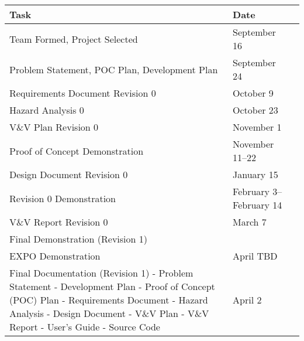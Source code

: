 \documentclass{article}
\begin{document}
\noindent \begin{tabular}{ p{5.7cm} l r}
    
    \textbf{Task} & \textbf{Date} \\
    \toprule
    Team Formed, Project Selected & September 16 \\
 
    Problem Statement, POC Plan, Development Plan & September 24 \\
 
    Requirements Document Revision 0 & October 9 \\
 
    Hazard Analysis 0 & October 23 \\
 
    V\&V Plan Revision 0 & November 1 \\
 
    Proof of Concept Demonstration & November 11--22 \\
 
    Design Document Revision 0 & January 15 \\
 
    Revision 0 Demonstration & February 3--February 14\\
 
    V\&V Report Revision 0 & March 7 \\
 
    Final Demonstration (Revision 1) \\
 
    EXPO Demonstration & April TBD \\
 
    Final Documentation (Revision 1)\newline 
     - Problem Statement\newline
     - Development Plan\newline
     - Proof of Concept (POC) Plan\newline
     - Requirements Document\newline
     - Hazard Analysis\newline
     - Design Document\newline
     - V\&V Plan\newline
     - V\&V Report\newline
     - User's Guide\newline
     - Source Code\newline &  April 2\\
   
 \end{tabular}
 
\end{document}
